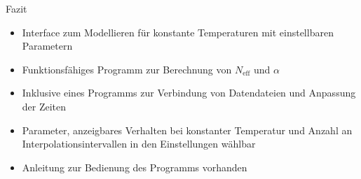 \documentclass[aspectratio=43, 10pt]{beamer}
\begin{document}

\begin{frame}{Fazit}
  \begin{itemize}
    \item Interface zum Modellieren für konstante Temperaturen mit einstellbaren Parametern
    \medskip
    \item Funktionsfähiges Programm zur Berechnung von $N_{\mathrm{eff}}$ und $\alpha$
    \medskip
    \item Inklusive eines Programms zur Verbindung von Datendateien und Anpassung der Zeiten
    \medskip
    \item Parameter, anzeigbares Verhalten bei konstanter Temperatur und Anzahl an Interpolationsintervallen in den
    Einstellungen wählbar
    \medskip
    \item Anleitung zur Bedienung des Programms vorhanden
  \end{itemize}
\end{frame}
\end{document}
